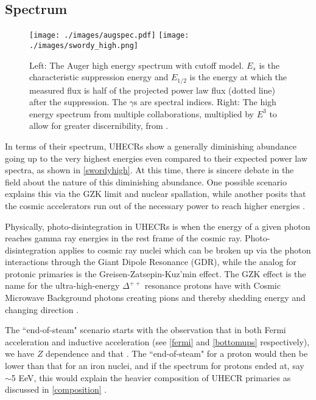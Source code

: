 \subsection{Spectrum} 
\begin{figure}[h!]
\begin{center}
\texttt{[image: ./images/augspec.pdf]}
\texttt{[image: ./images/swordy\_high.png]}
\begin{singlespace}
\caption[High Energy Cosmic Ray Spectrum]{Left: The Auger high energy spectrum with cutoff model. $E_{s}$ is the characteristic suppression energy and $E_{1/2}$ is the energy at which the measured flux is half of the projected power law flux (dotted line) after the suppression. The $\gamma$s are spectral indices. Right: The high energy spectrum from multiple collaborations, multiplied by $E^3$ to allow for greater discernibility, from .}
\end{singlespace}
\label{swordyhigh}
\end{center}
\end{figure}
In terms of their spectrum, UHECRs show a generally diminishing abundance going up to the very highest energies even compared to their expected power law spectra, as shown in \autoref{swordyhigh}. At this time, there is sincere debate in the field about the nature of this diminishing abundance. One possible scenario explains this via the GZK limit and nuclear spallation, while another posits that the cosmic accelerators run out of the necessary power to reach higher energies \cite{g,zk,futuregzk,spallation,endofsteam,astro2020}. 

Physically, photo-disintegration in UHECRs is when the energy of a given photon reaches gamma ray energies in the rest frame of the cosmic ray. Photo-disintegration applies to cosmic ray nuclei which can be broken up via the photon interactions through the Giant Dipole Resonance (GDR), while the analog for protonic primaries is the Greisen-Zatsepin-Kuz'min effect. The GZK effect is the name for the ultra-high-energy $\Delta^{++}$ resonance protons have with Cosmic Microwave Background photons creating pions and thereby shedding energy and changing direction \cite{g,zk,spallation}. 

The ``end-of-steam" scenario starts with the observation that in both Fermi acceleration and inductive acceleration (see \autoref{fermi} and \autoref{bottomups} respectively), we have $Z$ dependence and that . The ``end-of-steam" for a proton would then be lower than that for an iron nuclei, and if the spectrum for protons ended at, say $\sim$5 EeV, this would explain the heavier composition of UHECR primaries as discussed in \autoref{composition} \cite{endofsteam,astro2020}.

